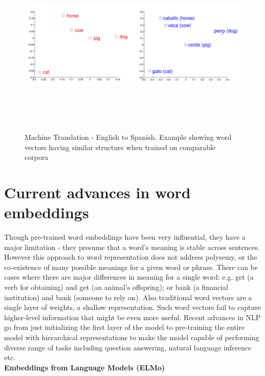 \begin{figure}[htbp]
\centering
\includegraphics[width=16cm, height=8cm]{images/machine-translation.PNG}\\
\centering
\caption{Machine Translation - English to Spanish. Example showing word vectors having similar structure when trained on comparable corpora}
\label{fig:foo}
\end{figure}

\newpage
\section{Current advances in word embeddings}

Though pre-trained word embeddings have been very influential, they have a major limitation - they presume that a word's meaning is stable across sentences. However this approach to word representation does not address polysemy, or the co-existence of many possible meanings for a given word or phrase. There can be cases where there are major differences in meaning for a single word: e.g. get (a verb for obtaining) and get (an animal's offspring); or bank (a financial institution) and bank (someone to rely on). Also traditional word vectors are a single layer of weights, a shallow representation. Such word vectors fail to capture higher-level information that might be even more useful. Recent advances in NLP go from just initializing the first layer of the model to pre-training the entire model with hierarchical representations to make the model capable of performing diverse range of tasks including question answering, natural language inference etc.\\

\noindent \textbf{Embeddings from Language Models (ELMo)}\\

